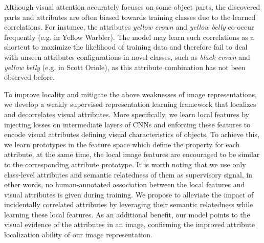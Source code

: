 Although visual attention accurately focuses on some object parts, the discovered parts and attributes are often biased towards training classes due to the learned correlations. 
For instance, the attributes \textit{yellow crown} and \textit{yellow belly} co-occur frequently (e.g. in Yellow Warbler). 
The model may learn such correlations as a shortcut to maximize the likelihood of training data and therefore fail to deal with unseen attributes configurations in novel classes, such as \textit{black crown} and \textit{yellow belly} (e.g. in Scott Oriole), as this attribute combination has not been observed before.


To improve locality and mitigate the above weaknesses of image representations, we develop a weakly supervised representation learning framework that localizes and decorrelates visual attributes. More specifically, we learn local features by injecting losses on intermediate layers of CNNs and enforcing these features to encode visual attributes defining visual characteristics of objects. To achieve this, we learn prototypes in the feature space which define the property for each attribute, 
at the same time, the local image features are encouraged to be similar to the corresponding attribute prototype. It is worth noting that we use only class-level attributes and semantic relatedness of them as supervisory signal, in other words, no human-annotated association between the local features and visual attributes is given during training. 
We propose to alleviate the impact of incidentally correlated attributes by leveraging their semantic relatedness while learning these local features. 
As an additional benefit, our model points to the visual evidence of the attributes in an image, confirming the improved attribute localization ability of our image representation.


















